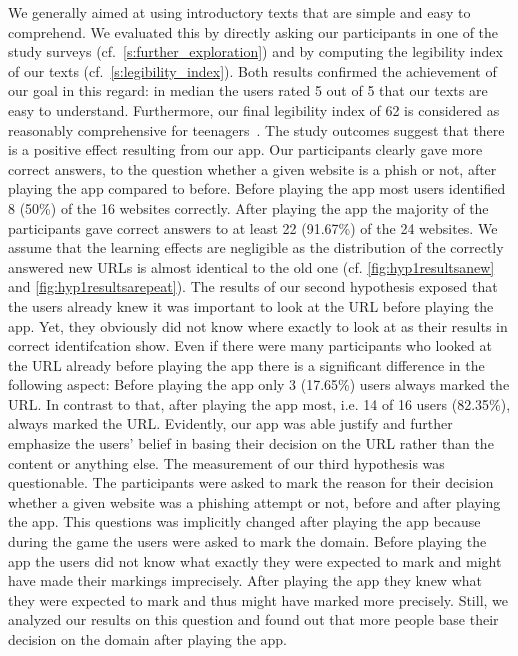 We generally aimed at using introductory texts that are simple and easy to comprehend.
We evaluated this by directly asking our participants in one of the study surveys (cf.~\autoref{s:further_exploration}) and by computing the legibility index of our texts (cf.~\autoref{s:legibility_index}). Both results confirmed the achievement of our goal in this regard: in median the users rated 5 out of 5 that our texts are easy to understand. Furthermore, our final legibility index of 62 is considered as reasonably comprehensive for teenagers~\cite{amstad1978verstandlich}.
The study outcomes suggest that there is a positive effect resulting from our app.
Our participants clearly gave more correct answers, to the question whether a given website is a phish or not, after playing the app compared to before.
Before playing the app most users identified 8 (50\%) of the 16 websites correctly.
After playing the app the majority of the participants gave correct answers to at least 22 (91.67\%) of the 24 websites.
We assume that the learning effects are negligible as the distribution of the correctly answered new URLs is almost identical to the old one (cf. \autoref{fig:hyp1resultsanew} and \autoref{fig:hyp1resultsarepeat}).
The results of our second hypothesis exposed that the users already knew it was important to look at the URL before playing the app.
Yet, they obviously did not know where exactly to look at as their results in correct identifcation show.
Even if there were many participants who looked at the URL already before playing the app there is a significant difference in the following aspect:
Before playing the app only 3 (17.65\%) users always marked the URL.
In contrast to that, after playing the app most, i.e. 14 of 16 users (82.35\%), always marked the URL.
Evidently, our app was able justify and further emphasize the users' belief in basing their decision on the URL rather than the content or anything else.
The measurement of our third hypothesis was questionable.
The participants were asked to mark the reason for their decision whether a given website was a phishing attempt or not, before and after playing the app. 
This questions was implicitly changed after playing the app because during the game the users were asked to mark the domain.
Before playing the app the users did not know what exactly they were expected to mark and might have made their markings imprecisely.
After playing the app they knew what they were expected to mark and thus might have marked more precisely.
Still, we analyzed our results on this question and found out that more people base their decision on the domain after playing the app.

